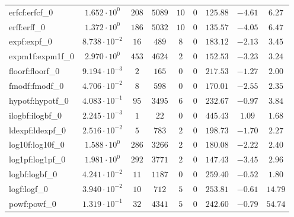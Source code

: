 \begin{tabular}{|l|c|c|c|c|c|c|c|c|}
erfcf:erfcf\_0               & $ 1.652 \cdot 10^{0}  $ & $ 208    $ & $ 5089   $ & $ 10  $ & $ 0   $ & $ 125.88      $ & $ -4.61   $ & $ 6.27    $ \\
erff:erff\_0                 & $ 1.372 \cdot 10^{0}  $ & $ 186    $ & $ 5032   $ & $ 10  $ & $ 0   $ & $ 135.57      $ & $ -4.05   $ & $ 6.47    $ \\
expf:expf\_0                 & $ 8.738 \cdot 10^{-2} $ & $ 16     $ & $ 489    $ & $ 8   $ & $ 0   $ & $ 183.12      $ & $ -2.13   $ & $ 3.45    $ \\
expm1f:expm1f\_0             & $ 2.970 \cdot 10^{0}  $ & $ 453    $ & $ 4624   $ & $ 2   $ & $ 0   $ & $ 152.53      $ & $ -3.23   $ & $ 3.24    $ \\
floorf:floorf\_0             & $ 9.194 \cdot 10^{-3} $ & $ 2      $ & $ 165    $ & $ 0   $ & $ 0   $ & $ 217.53      $ & $ -1.27   $ & $ 2.00    $ \\
fmodf:fmodf\_0               & $ 4.706 \cdot 10^{-2} $ & $ 8      $ & $ 598    $ & $ 0   $ & $ 0   $ & $ 170.01      $ & $ -2.55   $ & $ 2.35    $ \\
hypotf:hypotf\_0             & $ 4.083 \cdot 10^{-1} $ & $ 95     $ & $ 3495   $ & $ 6   $ & $ 0   $ & $ 232.67      $ & $ -0.97   $ & $ 3.84    $ \\
ilogbf:ilogbf\_0             & $ 2.245 \cdot 10^{-3} $ & $ 1      $ & $ 22     $ & $ 0   $ & $ 0   $ & $ 445.43      $ & $ 1.09    $ & $ 1.68    $ \\
ldexpf:ldexpf\_0             & $ 2.516 \cdot 10^{-2} $ & $ 5      $ & $ 783    $ & $ 2   $ & $ 0   $ & $ 198.73      $ & $ -1.70   $ & $ 2.27    $ \\
log10f:log10f\_0             & $ 1.588 \cdot 10^{0}  $ & $ 286    $ & $ 3266   $ & $ 2   $ & $ 0   $ & $ 180.08      $ & $ -2.22   $ & $ 2.40    $ \\
log1pf:log1pf\_0             & $ 1.981 \cdot 10^{0}  $ & $ 292    $ & $ 3771   $ & $ 2   $ & $ 0   $ & $ 147.43      $ & $ -3.45   $ & $ 2.96    $ \\
logbf:logbf\_0               & $ 4.241 \cdot 10^{-2} $ & $ 11     $ & $ 1187   $ & $ 0   $ & $ 0   $ & $ 259.40      $ & $ -0.52   $ & $ 1.80    $ \\
logf:logf\_0                 & $ 3.940 \cdot 10^{-2} $ & $ 10     $ & $ 712    $ & $ 5   $ & $ 0   $ & $ 253.81      $ & $ -0.61   $ & $ 14.79   $ \\
powf:powf\_0                 & $ 1.319 \cdot 10^{-1} $ & $ 32     $ & $ 4341   $ & $ 5   $ & $ 0   $ & $ 242.60      $ & $ -0.79   $ & $ 54.74   $ \\

\end{tabular}
